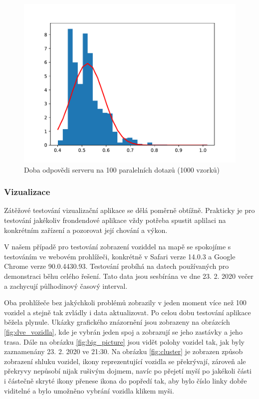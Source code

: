 \begin{figure}
	\centering
  \includegraphics[width=0.7\linewidth]{../img/server_response_time}
  \caption{Doba odpovědi serveru na 100 paralelních dotazů (1000 vzorků)}
  \label{fig:server_response_time}
\end{figure}

\subsubsection{Vizualizace}

Zátěžové testování vizualizační aplikace se dělá poměrně obtížně. Prakticky je pro testování jakékoliv frondendové aplikace vždy potřeba spustit aplilaci na konkrétním zařízení a pozorovat její chování a výkon.

\bigbreak

V našem případě pro testování zobrazení voziddel na mapě se spokojíme s testováním ve webovém prohlížeči, konkrétně v Safari verze 14.0.3 a Google Chrome verze 90.0.4430.93. Testování probíhá na datech používaných pro demonstraci běhu celého řešení. Tato data jsou sesbírána ve dne 23. 2. 2020 večer a zachycují půlhodinový časový interval.

\bigbreak

Oba prohlížeče bez jakýchkoli problémů zobrazily v jeden moment více než 100 vozidel a stejně tak zvládly i data aktualizovat. Po celou dobu testování aplikace běžela plynule. Ukázky grafického znázornění jsou zobrazeny na obrázcích \ref{fig:dve_vozidla}, kde je vybrán jeden spoj a zobrazují se jeho zastávky a jeho trasa. Dále na obrázku \ref{fig:big_picture} jsou vidět polohy vozidel tak, jak byly zaznamenány 23. 2. 2020 ve 21:30. Na obrázku \ref{fig:cluster} je zobrazen způsob zobrazení shluku vozidel, ikony reprezentující vozidla se překrývají, zároveň ale překryvy nepůsobí nijak rušivým dojmem, navíc po přejetí myší po jakékoli části i částečně skryté ikony přenese ikona do popředí tak, aby bylo číslo linky dobře viditelné a bylo umožněno vybrání vozidla klikem myši.


